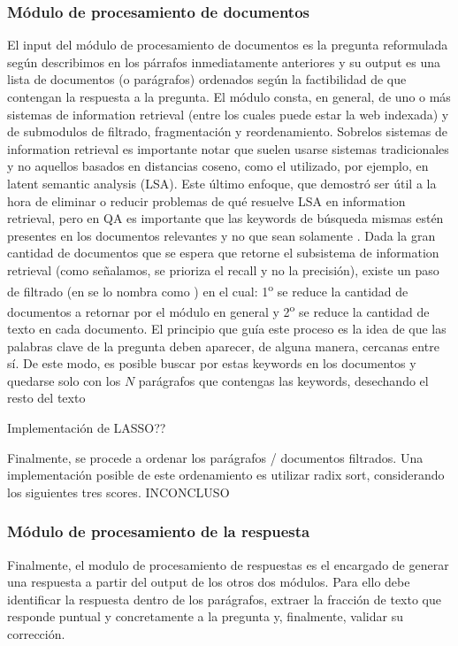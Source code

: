 \subsubsection*{Módulo de procesamiento de documentos}
El input del módulo de procesamiento de documentos es la pregunta reformulada según describimos en los párrafos inmediatamente anteriores y su output es una lista de documentos (o parágrafos) ordenados según la factibilidad de que contengan la respuesta a la pregunta. El módulo consta, en general, de uno o más sistemas de information retrieval (entre los cuales puede estar la web indexada) y de submodulos de filtrado, fragmentación y reordenamiento. Sobrelos sistemas de information retrieval es importante notar que suelen usarse sistemas tradicionales y no aquellos basados en distancias coseno, como el utilizado, por ejemplo, en latent semantic analysis (LSA). Este último enfoque, que demostró ser útil a la hora de eliminar o reducir problemas de {\color{red} qué resuelve LSA} en information retrieval, pero en QA es importante que las keywords de búsqueda mismas estén presentes en los documentos relevantes y no que sean solamente . Dada la gran cantidad de documentos que se espera que retorne el subsistema de information retrieval (como señalamos, se prioriza el recall y no la precisión), existe un paso de filtrado (en \cite{WATSON1} se lo nombra como ) en el cual: 1\textsuperscript{o} se reduce la cantidad de documentos a retornar por el módulo en general y 2\textsuperscript{o} se reduce la cantidad de texto en cada documento. El principio que guía este proceso es la idea de que las palabras clave de la pregunta deben aparecer, de alguna manera, cercanas entre sí. De este modo, es posible buscar por estas keywords en los documentos y quedarse solo con los $N$ parágrafos que contengas las keywords, desechando el resto del texto

{\color{red}Implementación de LASSO??}

Finalmente, se procede a ordenar los parágrafos / documentos filtrados. Una implementación posible de este ordenamiento es utilizar radix sort, considerando los siguientes tres scores. {\color{red} INCONCLUSO}


\subsubsection*{Módulo de procesamiento de la respuesta}
Finalmente, el modulo de procesamiento de respuestas es el encargado de generar una respuesta a partir del output de los otros dos módulos. Para ello debe identificar la respuesta dentro de los parágrafos, extraer la fracción de texto que responde puntual y concretamente a la pregunta y, finalmente, validar su corrección. 

